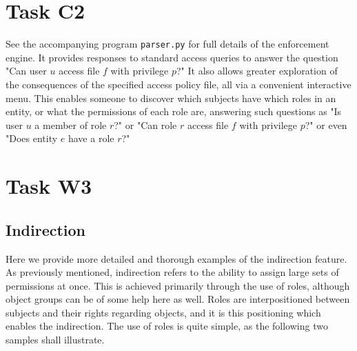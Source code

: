 \documentclass{article}
\providecommand{\task}[1]{\section{Task #1}}
\providecommand{\inlinecode}{\texttt}
\begin{document}
\task{C2}
See the accompanying program \inlinecode{parser.py} for full details of the enforcement engine. It provides responses to standard access queries to answer the question "Can user $u$ access file $f$ with privilege $p$?" It also allows greater exploration of the consequences of the specified access policy file, all via a convenient interactive menu. This enables someone to discover which subjects have which roles in an entity, or what the permissions of each role are, answering such questions as "Is user $u$ a member of role $r$?" or "Can role $r$ access file $f$ with privilege $p$?" or even "Does entity $e$ have a role $r$?"

\task{W3}
\subsection{Indirection}
Here we provide more detailed and thorough examples of the indirection feature.
As previously mentioned, indirection refers to the ability to assign large sets of permissions at once.
This is achieved primarily through the use of roles, although object groups can be of some help here as well.
Roles are interpositioned between subjects and their rights regarding objects, and it is this positioning which enables the indirection.
The use of roles is quite simple, as the following two samples shall illustrate.
\end{document}
